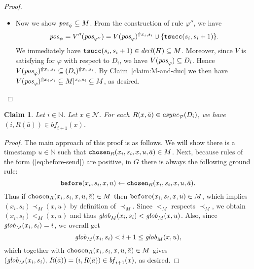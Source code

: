 \documentclass{tlp}
\newtheorem{claim}[theorem]{Claim}
\newcommand{\Nat}{\mathbb{N}}  \newcommand{\len}[1]{|#1|} \newcommand{\rom}[1]{\text{\emph{(#1)}}} \newcommand{\romI}{\rom i}
\newcommand{\ded}{\mathcal{P}}
\newcommand{\rl}{\varphi}
\newcommand{\bpos}[1]{\fname{pos}_{#1}}
\newcommand{\bneg}[1]{\fname{neg}_{#1}}
\newcommand{\schof}[1]{\fname{sch}(#1)}
\newcommand{\grl}{\psi}
\newcommand{\nw}{\mathcal{N}}
\newcommand{\toloct}[1]{#1^{\mathrm{LT}}}
\newcommand{\addlt}[3]{#1^{\Uparrow#2,#3}}
\newcommand{\projlt}[3]{#1|^{#2,#3}}
\newcommand{\timesucc}{\pred{tsucc}}
\newcommand{\before}{\pred{before}}
\newcommand{\chosen}{\pred{chosen}}
\newcommand{\decl}[1]{\fname{decl}(#1)}
\newcommand{\cnfb}{\mathit{bf}}
\newcommand{\pair}[2]{(#1,#2)}
\newcommand{\async}[1]{\fname{async}_{#1}}
\newcommand{\mstep}[1]{(#1)}
\newcommand{\grded}{G}
\newcommand{\cauM}{\prec_{M}}
\newcommand{\totM}{<_{M}}
\newcommand{\globM}[1]{\fname{glob}_{M}(#1)}
\begin{document}
\begin{appendix}
\begin{proof}
\begin{itemize}
Because $V$ is satisfying for $\rl$ with respect to $D_{i}$, we
have $V(\bneg{\rl})\cap D_{i}=\emptyset$. This gives $\addlt{V(\bneg{\rl})}{x_{i}}{s_{i}}\cap\addlt{(D_{i})}{x_{i}}{s_{i}}=\emptyset$.
Then $\addlt{V(\bneg{\rl})}{x_{i}}{s_{i}}\cap\projlt M{x_{i}}{s_{i}}=\emptyset$
by Claim~\ref{claim:M-and-duc}. Next, we obtain $\addlt{V(\bneg{\rl})}{x_{i}}{s_{i}}\cap M=\emptyset$
since $\addlt{V(\bneg{\rl})}{x_{i}}{s_{i}}$ contains only facts over
$\toloct{\schof{\ded}}$ with location specifier $x_{i}$ and timestamp
$s_{i}$.

\item Now we show $\bpos{\grl}\subseteq M$. From the construction of rule
$\rl''$, we have 
\[
\bpos{\grl}=V''(\bpos{\rl''})=\addlt{V(\bpos{\rl})}{x_{i}}{s_{i}}\cup\{\timesucc(s_{i},s_{i}+1)\}.
\]
We immediately have $\timesucc(s_{i},s_{i}+1)\in\decl H\subseteq M$.
Moreover, since $V$ is satisfying for $\rl$ with respect to $D_{i}$,
we have $V(\bpos{\rl})\subseteq D_{i}$. Hence $\addlt{V(\bpos{\rl})}{x_{i}}{s_{i}}\subseteq\addlt{(D_{i})}{x_{i}}{s_{i}}$.
By Claim~\ref{claim:M-and-duc} we then have $\addlt{V(\bpos{\rl})}{x_{i}}{s_{i}}\subseteq\projlt M{x_{i}}{s_{i}}\subseteq M$,
as desired.
\end{itemize}
\end{proof}



\tline



\begin{claim}\label{claim:async-in-bufM}Let $i\in\Nat$. Let $x\in\nw$.
For each $R(x,\bar{a})\in\async{\ded}\mstep{D_{i}}$, we have $\pair i{R(\bar{a})}\in\cnfb_{i+1}(x)$.
\end{claim}

\begin{proof}

The main approach of this proof is as follows. We will show there
is a timestamp $u\in\Nat$ such that $\chosen_{R}(x_{i},s_{i},x,u,\bar{a})\in M$.
Next, because rules of the form (\ref{eq:before-send}) are positive,
in $\grded$ there is always the following ground rule:
\[
\before(x_{i},s_{i},x,u)\gets\chosen_{R}(x_{i},s_{i},x,u,\bar{a}).
\]
Thus if $\chosen_{R}(x_{i},s_{i},x,u,\bar{a})\in M$ then $\before(x_{i},s_{i},x,u)\in M$,
which implies $(x_{i},s_{i})\cauM(x,u)$ by definition of $\cauM$.
Since $\totM$ respects $\cauM$, we obtain $(x_{i},s_{i})\totM(x,u)$
and thus $\globM{x_{i},s_{i}}<\globM{x,u}$. Also, since $\globM{x_{i},s_{i}}=i$,
we overall get 
\[
\globM{x_{i},s_{i}}<i+1\leq\globM{x,u},
\]
which together with $\chosen_{R}(x_{i},s_{i},x,u,\bar{a})\in M$ gives
$\pair{\globM{x_{i},s_{i}}}{\, R(\bar{a})}=\pair i{R(\bar{a})}\in\cnfb_{i+1}(x)$,
as desired.




\end{proof}
\end{appendix}
\end{document}
